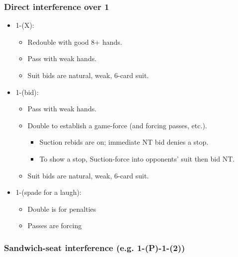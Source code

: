 \documentclass[a4paper,14pt]{extarticle}
\begin{document}
\subsubsection{Direct interference over 1\diamonds}
\label{sec:intf:1d}

\begin{itemize}
\item 1\diamonds-(X):
	\begin{itemize}
   \item Redouble with good 8+ hands.
   \item Pass with weak hands.
   \item Suit bids are natural, weak, 6-card suit.
	\end{itemize}
\item 1\diamonds-(bid):
	\begin{itemize}
   \item Pass with weak hands.
   \item Double to establish a game-force (and forcing passes, etc.).
		\begin{itemize}
      \item Suction rebids are on; immediate NT bid denies a stop.
      \item To show a stop, Suction-force into opponents' suit then bid NT.
		\end{itemize}
   \item Suit bids are natural, weak, 6-card suit.
	\end{itemize}
\item 1\diamonds-(spade for a laugh):
	\begin{itemize}
   \item Double is for penalties
   \item Passes are forcing
	\end{itemize}
\end{itemize}

\subsubsection{Sandwich-seat interference (e.g. 1\diamonds-(P)-1\spades-(2\clubs))}
\label{sec:intf:bal}
\end{document}
